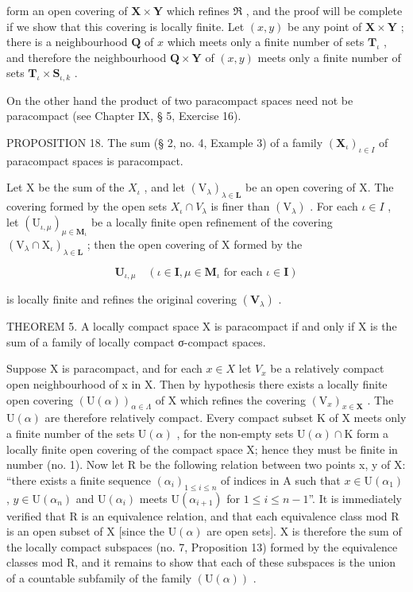 form an open covering of \(\mathbf{X} \times \mathbf{Y}\) which refines \(\Re\) , and the proof will be complete if we show that this covering is locally finite. Let \((x, y)\) be any point of \(\mathbf{X} \times \mathbf{Y}\) ; there is a neighbourhood \(\mathbf{Q}\) of \(x\) which meets only a finite number of sets \(\mathbf{T}_{\iota}\) , and therefore the neighbourhood \(\mathbf{Q} \times \mathbf{Y}\) of \((x, y)\) meets only a finite number of sets \(\mathbf{T}_{\iota} \times \mathbf{S}_{\iota,k}\) .

On the other hand the product of two paracompact spaces need not be paracompact (see Chapter IX, § 5, Exercise 16).

PROPOSITION 18. The sum (§ 2, no. 4, Example 3) of a family \((\mathbf{X}_{\iota})_{\iota\in I}\) of paracompact spaces is paracompact.

Let X be the sum of the \(X_{\iota}\) , and let \((\mathrm{V}_{\lambda})_{\lambda\in\mathbf{L}}\) be an open covering of X. The covering formed by the open sets \(X_{\iota}\cap V_{\lambda}\) is finer than \((\mathrm{V}_{\lambda})\) . For each \(\iota\in I\) , let \((\mathrm{U}_{\iota,\mu})_{\mu\in\mathbf{M}_{\iota}}\) be a locally finite open refinement of the covering \((\mathrm{V}_{\lambda}\cap\mathrm{X}_{\iota})_{\lambda\in\mathbf{L}}\) ; then the open covering of X formed by the

\[
\mathbf {U} _ {\iota , \mu} \quad (\iota \in \mathbf {I}, \mu \in \mathbf {M} _ {\iota} \text {   for   each   } \iota \in \mathbf {I})
\]

is locally finite and refines the original covering \((\mathbf{V}_{\lambda})\) .

THEOREM 5. A locally compact space X is paracompact if and only if X is the sum of a family of locally compact σ-compact spaces.

Suppose X is paracompact, and for each \(x \in X\) let \(V_x\) be a relatively compact open neighbourhood of x in X. Then by hypothesis there exists a locally finite open covering \((\mathrm{U}(\alpha))_{\alpha \in \Lambda}\) of X which refines the covering \((\mathrm{V}_x)_{x \in \mathbf{X}}\) . The \(\mathrm{U}(\alpha)\) are therefore relatively compact. Every compact subset K of X meets only a finite number of the sets \(\mathrm{U}(\alpha)\) , for the non-empty sets \(\mathrm{U}(\alpha) \cap \mathrm{K}\) form a locally finite open covering of the compact space X; hence they must be finite in number (no. 1). Now let R be the following relation between two points x, y of X: ``there exists a finite sequence \((\alpha_i)_{1 \leqslant i \leqslant n}\) of indices in A such that \(x \in \mathrm{U}(\alpha_1)\) , \(y \in \mathrm{U}(\alpha_n)\) and \(\mathrm{U}(\alpha_i)\) meets \(\mathrm{U}(\alpha_{i+1})\) for \(1 \leqslant i \leqslant n - 1\)''. It is immediately verified that R is an equivalence relation, and that each equivalence class mod R is an open subset of X {[}since the \(\mathrm{U}(\alpha)\) are open sets{]}. X is therefore the sum of the locally compact subspaces (no. 7, Proposition 13) formed by the equivalence classes mod R, and it remains to show that each of these subspaces is the union of a countable subfamily of the family \((\mathrm{U}(\alpha))\) .

